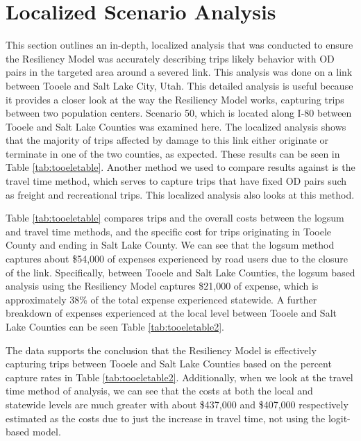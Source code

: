 \section{Localized Scenario Analysis}

This section outlines an in-depth, localized analysis that was conducted to ensure
the Resiliency Model was accurately describing trips likely behavior with OD pairs in the
targeted area around a severed link. This analysis was done on a link between
Tooele and Salt Lake City, Utah. This detailed analysis is useful because it
provides a closer look at the way the Resiliency Model works, capturing trips
between two population centers. Scenario 50, which is located along I-80 between Tooele and Salt Lake Counties
was examined here. The localized analysis shows that the majority of trips
affected by damage to this link either originate or terminate in one of the
two counties, as expected. These results can be seen in Table
\ref{tab:tooeletable}. Another method we used to compare results against is
the travel time method,
which serves to capture trips that have fixed OD pairs such as freight and
recreational trips. This localized analysis also looks at this method.

Table \ref{tab:tooeletable} compares trips and the overall costs between the
logsum and travel time methods, and the specific cost for trips originating in
Tooele County and ending in Salt Lake County. We can see that the logsum
method captures about
\$54,000 of expenses experienced by road users due to the closure of the
link. Specifically, between Tooele and Salt Lake Counties, the logsum based analysis using the Resiliency
Model captures \$21,000 of
expense, which is approximately 38\% of the total expense experienced
statewide. A further breakdown of expenses experienced at the local level
between Tooele and Salt Lake Counties
can be seen Table \ref{tab:tooeletable2}.

The data supports the conclusion that the Resiliency Model is effectively
capturing trips between Tooele and Salt Lake Counties based on the percent capture
rates in Table \ref{tab:tooeletable2}. Additionally, when we look at the
travel time method of analysis, we can see that the costs at both the local and
statewide levels are much greater with about \$437,000 and \$407,000
respectively estimated as the costs due to just the increase in travel time, not using
the logit-based model.

